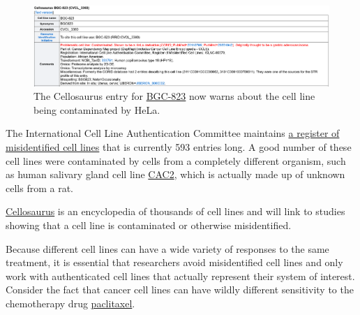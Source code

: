 \documentclass[letterpaper, 12pt]{article}
\begin{document}
\begin{figure}[h!tbp]
    \includegraphics[width=\textwidth]{img/cell_lines/Screenshot 2024-11-04 at 11-59-23 Cellosaurus cell line BGC-823 (CVCL_3360).png}
    \caption*{The Cellosaurus entry for \href{https://www.cellosaurus.org/CVCL_3360}{BGC-823} now warns about the cell line being contaminated by HeLa.}
\end{figure}

The International Cell Line Authentication Committee maintains \href{https://iclac.org/databases/cross-contaminations/}{a register of misidentified cell lines} that is currently 593 entries long. A good number of these cell lines were contaminated by cells from a completely different organism, such as human salivary gland cell line \href{https://www.cellosaurus.org/CVCL_6883}{CAC2}, which is actually made up of unknown cells from a rat.

\href{https://www.cellosaurus.org/index.html}{Cellosaurus} is an encyclopedia of thousands of cell lines and will link to studies showing that a cell line is contaminated or otherwise misidentified.

Because different cell lines can have a wide variety of responses to the same treatment, it is essential that researchers avoid misidentified cell lines and only work with authenticated cell lines that actually represent their system of interest. Consider the fact that cancer cell lines can have wildly different sensitivity to the chemotherapy drug \href{https://www.cancerrxgene.org/compound/Paclitaxel/11/overview/ic50?tissue=PANCANCER&screening_set=GDSC1}{paclitaxel}.
\end{document}
